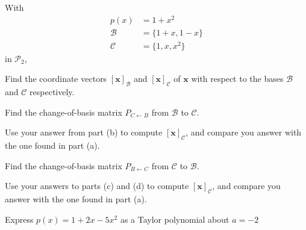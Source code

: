 \documentclass[oneperpage]{gsypset}
\begin{document}
	\begin{problem}[6.3.7]
		With
		\begin{align*}
			p(x) &= 1 + x^2 \\
			\mathcal{B} &= \{1+x, 1-x\} \\
			\mathcal{C} &= \{1,x,x^2\}
		\end{align*}
		in $\mathscr{P}_2$,
		\begin{subproblems}[(a)]
			\subproblem
				Find the coordinate vectors $[\mathbf{x}]_\mathcal{B}$ and $[\mathbf{x}]_\mathcal{C}$
				of $\mathbf{x}$ with respect to the bases $\mathcal{B}$ and $\mathcal{C}$ respectively.
				\begin{solution}
					
				\end{solution}
				
			\subproblem
				Find the change-of-basis matrix $P_{C \leftarrow B}$ from $\mathcal{B}$ to $\mathcal{C}$.
				\begin{solution}
					
				\end{solution}
				
			\subproblem
				Use your answer from part (b) to compute $[\mathbf{x}]_\mathcal{C}$, 
				and compare you answer with the one found in part (a).
				\begin{solution}
					
				\end{solution}
				
			\subproblem
				Find the change-of-basis matrix $P_{B \leftarrow C}$ from $\mathcal{C}$ to $\mathcal{B}$.
				\begin{solution}
					
				\end{solution}
				
			\subproblem
				Use your answers to parts (c) and (d) to compute $[\mathbf{x}]_\mathcal{C}$, 
				and compare you answer with the one found in part (a).
				\begin{solution}
					
				\end{solution}
		\end{subproblems}
	\end{problem}
	
	\begin{problem}[6.3.18]
		Express $p(x)=1 + 2x - 5x^2$ as a Taylor polynomial about $a = -2$
	\end{problem}
	\begin{solution}
		
	\end{solution}
	
\end{document}
